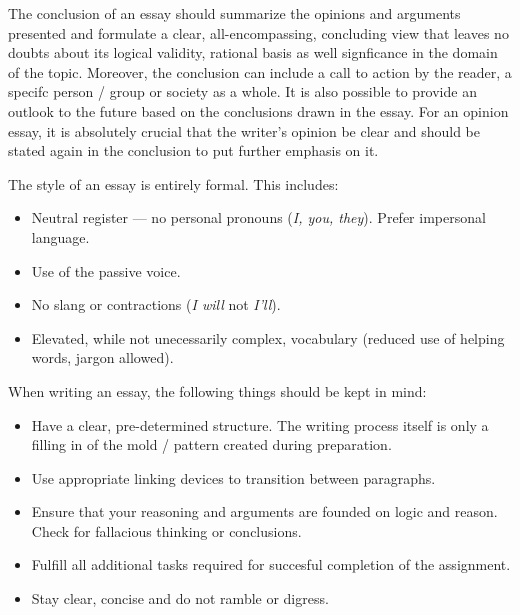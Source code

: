 \begin{enumerate}
\pagebreak


	The conclusion of an essay should summarize the opinions and arguments presented and formulate a clear, all-encompassing, concluding view that leaves no doubts about its logical validity, rational basis as well signficance in the domain of the topic. Moreover, the conclusion can include a call to action by the reader, a specifc person / group or society as a whole. It is also possible to provide an outlook to the future based on the conclusions drawn in the essay. For an opinion essay, it is absolutely crucial that the writer's opinion be clear and should be stated again in the conclusion to put further emphasis on it.

\end{enumerate}


The style of an essay is entirely formal. This includes:

\begin{itemize}

	\item Neutral register --- no personal pronouns (\emph{I, you, they}). Prefer impersonal language.

	\item Use of the passive voice. 

	\item No slang or contractions (\emph{I will} not \emph{I'll}).

	\item Elevated, while not unecessarily complex, vocabulary (reduced use of helping words, jargon allowed).

\end{itemize}


When writing an essay, the following things should be kept in mind:

\begin{itemize}

	\item Have a clear, pre-determined structure. The writing process itself is only a filling in of the mold / pattern created during preparation.

	\item Use appropriate linking devices to transition between paragraphs.

	\item Ensure that your reasoning and arguments are founded on logic and reason. Check for fallacious thinking or conclusions.

	\item Fulfill all additional tasks required for succesful completion of the assignment.

	\item Stay clear, concise and do not ramble or digress.

\end{itemize}

